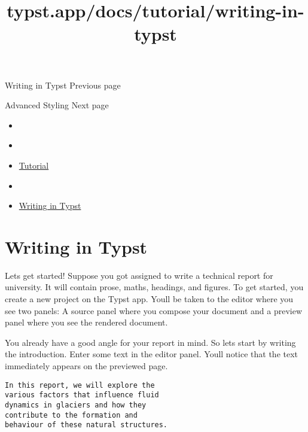 \href{/docs/tutorial/writing-in-typst/}{\pandocbounded{}}

{ Writing in Typst } { Previous page }

\href{/docs/tutorial/advanced-styling/}{\pandocbounded{}}

{ Advanced Styling } { Next page }


\title{typst.app/docs/tutorial/writing-in-typst}

\begin{itemize}
\tightlist
\item
  \href{/docs}{}
\item
  
\item
  \href{/docs/tutorial/}{Tutorial}
\item
  
\item
  \href{/docs/tutorial/writing-in-typst/}{Writing in Typst}
\end{itemize}

\section{Writing in Typst}\label{writing-in-typst}

Let\textquotesingle s get started! Suppose you got assigned to write a
technical report for university. It will contain prose, maths, headings,
and figures. To get started, you create a new project on the Typst app.
You\textquotesingle ll be taken to the editor where you see two panels:
A source panel where you compose your document and a preview panel where
you see the rendered document.


You already have a good angle for your report in mind. So
let\textquotesingle s start by writing the introduction. Enter some text
in the editor panel. You\textquotesingle ll notice that the text
immediately appears on the previewed page.

\begin{verbatim}
In this report, we will explore the
various factors that influence fluid
dynamics in glaciers and how they
contribute to the formation and
behaviour of these natural structures.
\end{verbatim}

